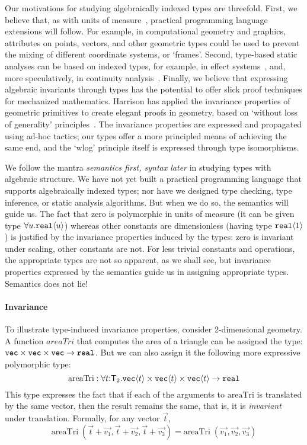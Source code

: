 Our motivations for studying algebraically indexed types are
threefold. First, we believe that, as with
units of measure~\cite{fsharp}, practical programming language
extensions will follow. For example, in computational geometry and
graphics, attributes on points, vectors, and other geometric types
could be used to prevent the mixing of different coordinate systems,
or `frames'. Second, type-based static analyses can be based on
indexed types, for example, in effect systems~\cite{benton06reading},
and, more speculatively, in continuity
analysis~\cite{chaudhuri10continuity}.  Finally, we believe that
expressing algebraic invariants through types has the potential to
offer slick proof techniques for mechanized
mathematics. Harrison has applied the
invariance properties of geometric primitives to create elegant proofs
in geometry, based on `without loss of
generality' principles~\cite{harrison09without}. The invariance properties are expressed 
and propagated using ad-hoc tactics; our types offer a more principled
means of achieving the same end, and the `wlog' principle itself
is expressed through type isomorphisms.

We follow the mantra \emph{semantics first, syntax later} in studying
types with algebraic structure. We have not yet built a practical
programming language that supports algebraically indexed types; nor
have we designed type checking, type inference, or static analysis
algorithms.  But when we do so, the semantics will guide us. The fact
that zero is polymorphic in units of measure (it can be given type $\forall
u.\textup{\texttt{real}}\langle u \rangle$) whereas other constants are dimensionless (having
type $\textup{\texttt{real}}\langle 1 \rangle$) is justified by the invariance properties
induced by the types: zero is invariant under scaling, other constants
are not. For less trivial constants and operations, the appropriate types are
not so apparent, as we shall see, but invariance properties expressed by
the semantics guide us in assigning appropriate types. Semantics does not lie!


\paragraph{Invariance}
To illustrate type-induced invariance properties, consider
2-dimensional geometry. 
A function $\mathit{areaTri}$ that computes the area of a triangle
can be assigned the type:
$\textup{\texttt{vec}}\times\textup{\texttt{vec}}\times\textup{\texttt{vec}}\to\texttt{real}$.
But we can also assign it the following more expressive polymorphic
type:
\[
\mathrm{areaTri} : \forall t\mathord:\mathsf{T}_2.
  \textup{\texttt{vec}}\langle t \rangle \times \textup{\texttt{vec}}\langle t \rangle \times \textup{\texttt{vec}}\langle t \rangle \to \texttt{real} \\
\]
This type expresses the fact that if each of the arguments to $\mathrm{areaTri}$
is translated by the same vector, then the result remains the same,
that is, it is \emph{invariant} under translation. Formally, for any 
vector $\vec t$,
\[
\mathrm{areaTri}\;(\vec{t} + \vec{v_1}, \vec{t} + \vec{v_2}, \vec{t} + \vec{v_3}) = 
\mathrm{areaTri}\;(\vec{v_1}, \vec{v_2}, \vec{v_3})
\]

